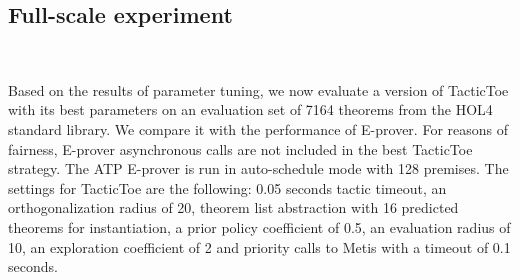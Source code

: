 \documentclass[runningheads,a4paper,draft]{svjour3}
\def\holfour{\textsf{HOL4}\xspace}
\def\eprover{\textsf{E-prover}\xspace}
\def\metis{\textsf{Metis}\xspace}
\def\tactictoe{\textsf{TacticToe}\xspace}
\begin{document}
%
%
%


\subsection{Full-scale experiment}~\label{sec:full_exp}

Based on the results of parameter tuning, we now evaluate a version of
\tactictoe with its best parameters on an evaluation set of 7164 theorems from
the \holfour standard library. We compare it with the performance of \eprover.
For reasons of fairness, \eprover asynchronous calls are not included in the
best \tactictoe strategy. The ATP \eprover is run in auto-schedule mode with
128 premises. The settings for \tactictoe are the following:
0.05 seconds tactic timeout, an orthogonalization radius of 20, theorem list
abstraction with 16 predicted theorems for instantiation, a prior policy
coefficient of 0.5, an evaluation radius of 10, an exploration coefficient of 2
and priority calls to \metis with a timeout of 0.1 seconds.
\end{document}
